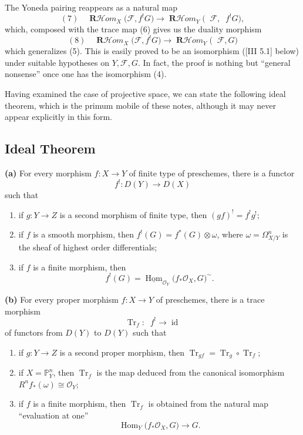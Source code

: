 \documentclass[12pt]{book}
\newcommand{\sheaf}[1]{\mathcal{#1}}
\DeclareMathOperator{\Hom}{Hom}
\DeclareMathOperator{\id}{id}
\DeclareMathOperator{\Rfst}{\mathbf{R}f_*}
\DeclareMathOperator{\RHom}{\mathbf{R}\mathcal{H}\textit{om}}
\begin{document}
The Yoneda pairing reappears as a natural map
\[
(7)\quad \RHom_X\bigl(\sheaf{F},f^! G\bigr)
\to \RHom_Y\bigl(\Rfst \sheaf{F},\Rfst f^! G\bigr),
\]
which, composed with the trace map (6) gives us the duality morphism
\[
(8)\quad \RHom_X\bigl(\sheaf{F},f^! G\bigr)
\to \RHom_Y\bigl(\Rfst \sheaf{F}, G\bigr)
\]
which generalizes (5). This is easily proved to be an isomorphism ([III 5.1] below) under suitable hypotheses on \(Y,\sheaf{F},G\). In fact, the proof is nothing but ``general nonsense'' once one has the isomorphism (4).

Having examined the case of projective space, we can state the following ideal theorem, which is the primum mobile of these notes, although it may never appear explicitly in this form.

\subsection*{Ideal Theorem}
\textbf{(a)} For every morphism \(f\colon X\to Y\) of finite type of preschemes, there is a functor
\[
f^!\colon D(Y)\to D(X)
\]
such that
\begin{enumerate}
\item if \(g\colon Y\to Z\) is a second morphism of finite type, then \((gf)^! = f^! g^!\);
\item if \(f\) is a smooth morphism, then \(f^!(G)=f^*(G)\otimes\omega\), where \(\omega=\Omega_{X/Y}^{n}\) is the sheaf of highest order differentials;
\item if \(f\) is a finite morphism, then
\[
f^!(G)=\underline{\Hom}_{\sheaf{O}_Y}\bigl(f_*\sheaf{O}_X,G\bigr)^{\sim}.
\]
\end{enumerate}

\textbf{(b)} For every proper morphism \(f\colon X\to Y\) of preschemes, there is a trace morphism
\[
\operatorname{Tr}_f\colon \Rfst f^! \to \id
\]
of functors from \(D(Y)\) to \(D(Y)\) such that
\begin{enumerate}
\item if \(g\colon Y\to Z\) is a second proper morphism, then \(\operatorname{Tr}_{gf}=\operatorname{Tr}_g\circ\operatorname{Tr}_f\);
\item if \(X=\mathbb{P}_Y^n\), then \(\operatorname{Tr}_f\) is the map deduced from the canonical isomorphism \(R^{n}f_*(\omega)\cong\sheaf{O}_Y\);
\item if \(f\) is a finite morphism, then \(\operatorname{Tr}_f\) is obtained from the natural map ``evaluation at one''
\[
\Hom_Y\bigl(f_*\sheaf{O}_X,G\bigr)\to G.
\]
\end{enumerate}
\end{document}
